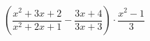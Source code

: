 \begin{ex}[type=expression]
	\begin{condition}
		\(\left( \dfrac{x^2+3x+2}{x^2+2x+1}-\dfrac{3x+4}{3x+3} \right)\cdot\dfrac{x^2-1}{3}\)
	\end{condition}
\end{ex}